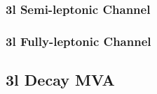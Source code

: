  
\subsubsection{ 3l Semi-leptonic Channel}                                                                            
\label{subsec:pt3lS}                                                                                                    



 
\subsubsection{ 3l Fully-leptonic Channel}                                                                            
\label{subsec:pt3lF}                                                                                                    




\subsection{3l Decay MVA}
\label{subsec:decayMVA}



